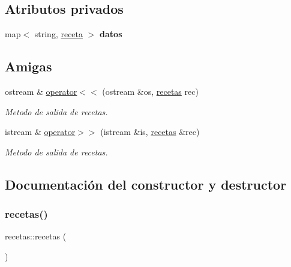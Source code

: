 \subsection*{Atributos privados}
\begin{DoxyCompactItemize}
\item 
\mbox{\label{classrecetas_aefd3481b61db689d1aa2762004eea715}} 
map$<$ string, \hyperlink{classreceta}{receta} $>$ {\bfseries datos}
\end{DoxyCompactItemize}
\subsection*{Amigas}
\begin{DoxyCompactItemize}
\item 
ostream \& \hyperlink{classrecetas_a6d22e5920fcf4c27d4bc01fc88c6bd84}{operator$<$$<$} (ostream \&os, \hyperlink{classrecetas}{recetas} rec)
\begin{DoxyCompactList}\small\item\em Metodo de salida de recetas. \end{DoxyCompactList}\item 
istream \& \hyperlink{classrecetas_ad812452076c1f84b23969bc5983e0977}{operator$>$$>$} (istream \&is, \hyperlink{classrecetas}{recetas} \&rec)
\begin{DoxyCompactList}\small\item\em Metodo de salida de recetas. \end{DoxyCompactList}\end{DoxyCompactItemize}


\subsection{Documentación del constructor y destructor}
\mbox{\label{classrecetas_a464457ebc9cd2b5606c1eab9fcafe87c}} 
\subsubsection{\texorpdfstring{recetas()}{recetas()}\hspace{0.1cm}{\footnotesize\ttfamily [1/3]}}
{\footnotesize\ttfamily recetas\+::recetas (\begin{DoxyParamCaption}{ }\end{DoxyParamCaption})}



